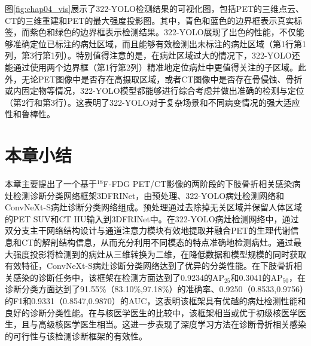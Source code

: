 图\ref{fig:chap04_vis}展示了322-YOLO检测结果的可视化图，包括PET的三维点云、CT的三维重建和PET的最大强度投影图。其中，青色和蓝色的边界框表示真实标签，而紫色和绿色的边界框表示检测结果。322-YOLO展现了出色的性能，不仅能够准确定位已标注的病灶区域，而且能够有效检测出未标注的病灶区域（第1行第1列，第3行第1列）。特别值得注意的是，在病灶区域过大的情况下，322-YOLO还能通过使用两个边界框（第1行第2列）精准地定位病灶中更值得关注的子区域。此外，无论PET图像中是否存在高摄取区域，或者CT图像中是否存在骨侵蚀、骨折或内固定物等情况，322-YOLO模型都能够进行综合考虑并做出准确的检测与定位（第2行和第3行）。这表明了322-YOLO对于复杂场景和不同病变情况的强大适应性和鲁棒性。

\section{本章小结}

本章主要提出了一个基于\(^{18}\)F-FDG PET/CT影像的两阶段的下肢骨折相关感染病灶检测诊断分类网络框架3DFRINet，由预处理、322-YOLO病灶检测网络和ConvNeXt-S病灶诊断分类网络组成。预处理通过去除掉无关区域并保留人体区域的PET SUV和CT HU输入到3DFRINet中。在322-YOLO病灶检测网络中，通过双分支主干网络结构设计与通道注意力模块有效地提取并融合PET的生理代谢信息和CT的解剖结构信息，从而充分利用不同模态的特点准确地检测病灶。通过最大强度投影将检测到的病灶从三维转换为二维，在降低数据和模型规模的同时获取有效特征，ConvNeXt-S病灶诊断分类网络达到了优异的分类性能。在下肢骨折相关感染的诊断任务中，该框架在检测方面达到了0.9234的AP\(_{25}\)和0.3041的AP\(_{50}\)，在诊断分类方面达到了91.55\%（83.10\%,97.18\%）的准确率、0.9250（0.8533,0.9756）的F1和0.9331（0.8547,0.9870）的AUC，这表明该框架具有优越的病灶检测性能和良好的诊断分类性能。在与核医学医生的比较中，该框架相当或优于初级核医学医生，且与高级核医学医生相当。这进一步表现了深度学习方法在诊断骨折相关感染的可行性与该检测诊断框架的有效性。